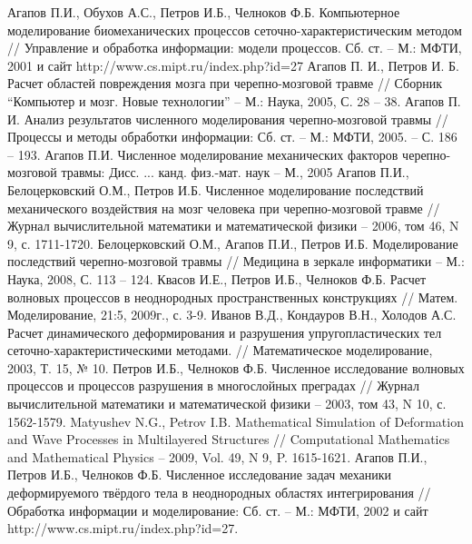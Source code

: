 \begin{thebibliography}{99}
 Агапов П.И., Обухов А.С., Петров И.Б., Челноков Ф.Б. Компьютерное моделирование биомеханических процессов сеточно-характеристическим методом // Управление и обработка информации: модели процессов. Сб. ст. – М.: МФТИ, 2001 и сайт http://www.cs.mipt.ru/index.php?id=27
 Агапов П. И., Петров И. Б. Расчет областей повреждения мозга при черепно-мозговой травме // Сборник “Компьютер и мозг. Новые технологии” – М.: Наука, 2005, С. 28 – 38.
 Агапов П. И. Анализ результатов численного моделирования черепно-мозговой травмы // Процессы и методы обработки информации: Сб. ст. – М.: МФТИ, 2005. – С. 186 – 193.
 Агапов П.И. Численное моделирование механических факторов черепно-мозговой травмы: Дисс. ... канд. физ.-мат. наук – М., 2005
Агапов П.И., Белоцерковский О.М., Петров И.Б. Численное моделирование последствий механического воздействия на мозг человека при черепно-мозговой травме // Журнал вычислительной математики и математической физики – 2006, том 46, N 9, с. 1711-1720.
 Белоцерковский О.М., Агапов П.И., Петров И.Б. Моделирование последствий черепно-мозговой травмы // Медицина в зеркале информатики – М.: Наука, 2008, С. 113 – 124.
Квасов И.Е., Петров И.Б., Челноков Ф.Б. Расчет волновых процессов в неоднородных пространственных конструкциях // Матем. Моделирование, 21:5, 2009г., с. 3-9.
Иванов В.Д., Кондауров В.Н., Холодов А.С. Расчет динамического деформирования и разрушения упругопластических тел сеточно-характеристическими методами. // Математическое моделирование, 2003, Т. 15, № 10.
Петров И.Б., Челноков Ф.Б. Численное исследование волновых процессов и процессов разрушения в многослойных преградах // Журнал вычислительной математики и математической физики – 2003, том 43, N 10, с. 1562-1579.
Matyushev N.G., Petrov I.B. Mathematical Simulation of Deformation and Wave Processes in Multilayered Structures // Computational Mathematics and Mathematical Physics – 2009, Vol. 49, N 9, P. 1615-1621.
 Агапов П.И., Петров И.Б., Челноков Ф.Б. Численное исследование задач механики деформируемого твёрдого тела в неоднородных областях интегрирования // Обработка информации и моделирование: Сб. ст. – М.: МФТИ, 2002 и сайт http://www.cs.mipt.ru/index.php?id=27.


\end{thebibliography}
